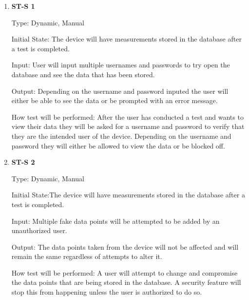 \documentclass[12pt, titlepage]{article}
\begin{document}
\begin{enumerate}

  \item{\bf{ST-S 1}}

  Type: Dynamic, Manual
            
  Initial State: The device will have measurements stored in the database after a test is completed.
            
  Input: User will input multiple usernames and passwords to try open the database and see the data that has been stored.
            
  Output: Depending on the username and password inputed the user will either be able to see the data or be prompted with an error message.
            
  How test will be performed: After the user has conducted a test and wants to view their data they will be asked for a username and password to verify that they are the intended user of the device. Depending on the username and password they will either be allowed to view the data or be blocked off.

  
  \item{\bf{ST-S 2}}
  
  Type: Dynamic, Manual
            
  Initial State:The device will have measurements stored in the database after a test is completed.
            
  Input: Multiple fake data points will be attempted to be added by an unauthorized user.
            
  Output: The data points taken from the device will not be affected and will remain the same regardless of attempts to alter it.
            
  How test will be performed: A user will attempt to change and compromise the data points that are being stored in the database. A security feature will stop this from happening unless the user is authorized to do so.
  

  
\end{enumerate}
\end{document}
